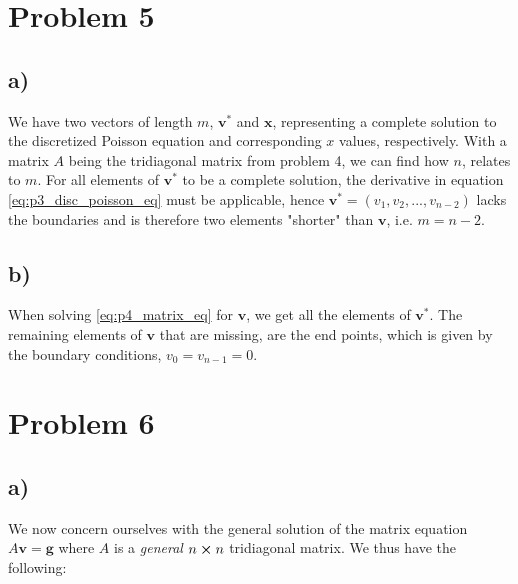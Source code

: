 \documentclass[english,notitlepage,nofootinbib]{revtex4-1}  %
\renewcommand{\vec}{\mathbf}
\begin{document}
\section*{Problem 5}
\subsection*{a)}
We have two vectors of length $m$, $\mathbf{v}^*$ and $\mathbf{x}$, representing a complete solution to the discretized Poisson equation and corresponding $x$ values, respectively. With a matrix $A$ being the tridiagonal matrix from problem 4, we can find how $n$, relates to $m$. For all elements of $\mathbf{v}^*$ to be a complete solution, the derivative in equation \eqref{eq:p3_disc_poisson_eq} must be applicable, hence $\vec{v}^*=(v_1, v_2, ..., v_{n-2})$ lacks the boundaries and is therefore two elements "shorter" than $\vec{v}$, i.e. $m=n-2$. 

\subsection*{b)}
When solving \eqref{eq:p4_matrix_eq} for $\mathbf{v}$, we get all the elements of $\vec{v}^*$. The remaining elements of $\mathbf{v}$ that are missing, are the end points, which is given by the boundary conditions, $v_0=v_{n-1}=0$.


\section*{Problem 6}
\subsection*{a)}
We now concern ourselves with the general solution of the matrix equation $A\vec{v} = \vec{g}$ where $A$ is a \textit{general} $n\cross n$ tridiagonal matrix. We thus have the following:
\end{document}

